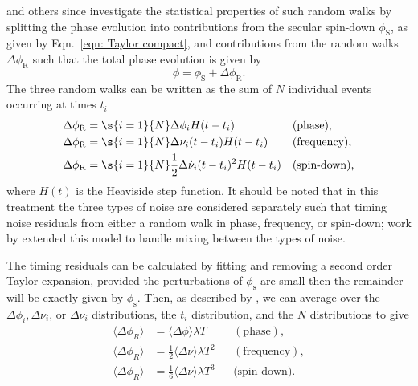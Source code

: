 \citet{Boynton1972} and others since investigate the statistical properties of
such random walks by splitting the phase evolution into contributions from the
secular spin-down $\phi_{\mathrm{S}}$, as given by Eqn.~\eqref{eqn: Taylor
compact}, and contributions from the random walks $\Delta\phi_\mathrm{R}$ such
that the total phase evolution is given by
\begin{equation}
    \phi = \phi_{\mathrm{S}} + \Delta\phi_{\mathrm{R}}.
\end{equation}
The three random walks can be written as the sum of $N$ individual events
occurring at times $t_{i}$
\begin{align}
    \Delta\phi_{\mathrm{R}} & = \s{i=1}{N}\Delta\phi_{i} H(t - t_{i})
     && \mathrm{(phase),} \\
    \Delta\phi_{\mathrm{R}} & = \s{i=1}{N}\Delta\nu_{i} (t-t_{i})H(t - t_{i})
     && \mathrm{(frequency),} \\
    \Delta\phi_{\mathrm{R}} & = \s{i=1}{N}\frac{1}{2}\Delta\dot{\nu}_{i} (t-t_{i})^{2}H(t - t_{i})
     && \textrm{(spin-down),}
\end{align}
where $H(t)$ is the Heaviside step function. It should be noted that in this
treatment the three types of noise are considered separately such that timing
noise residuals from either a random walk in phase, frequency, or spin-down;
work by \citet{Cordes1980} extended this model to handle mixing between the
types of noise.

The timing residuals can be calculated by fitting and removing a second order
Taylor expansion, provided the perturbations
of $\phi_{\mathrm{s}}$ are small then the remainder will be exactly given by
$\phi_{\mathrm{s}}$. Then, as described by \citet{Boynton1972}, we can
average over the $\Delta\phi_{i}, \Delta\nu_{i}$, or $\Delta\dot{\nu}_{i}$
distributions, the $t_{i}$ distribution, and the $N$ distributions to give
\begin{align}
    \langle \Delta\phi_{R} \rangle & = \langle \Delta\phi \rangle \lambda T
    && \mathrm{(phase),} \\
    \langle \Delta\phi_{R} \rangle & = \frac{1}{2}\langle \Delta\nu \rangle \lambda T^{2}
    && \mathrm{(frequency),} \\
    \langle \Delta\phi_{R} \rangle & = \frac{1}{6}\langle \Delta\dot{\nu} \rangle \lambda T^{3}
    && \textrm{(spin-down).}
\label{eqn: RW comps}
\end{align}


